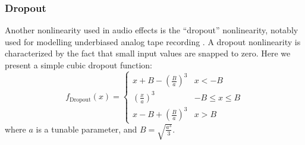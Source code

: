 \documentclass[twoside,a4paper]{article}
\begin{document}
\subsubsection{Dropout} \label{sec:drop}
%
Another nonlinearity used in audio effects is the ``dropout'' nonlinearity,
notably used for modelling underbiased analog tape recording \cite{DAFX-tape}.
A dropout nonlinearity is characterized by the fact that small input values
are snapped to zero. Here we present a simple cubic dropout function:
%
\begin{equation}
    f_{\text{Dropout}}(x) = \begin{cases}
        x + B - \left(\frac{B}{a}\right)^3& x < -B \\
        \left(\frac{x}{a}\right)^3& -B \leq x \leq B \\
        x - B + \left(\frac{B}{a}\right)^3& x > B
    \end{cases}
    \label{eq:dropout}
\end{equation}
%
where $a$ is a tunable parameter, and $B = \sqrt{\frac{a^3}{3}}$.
%
\end{document}
